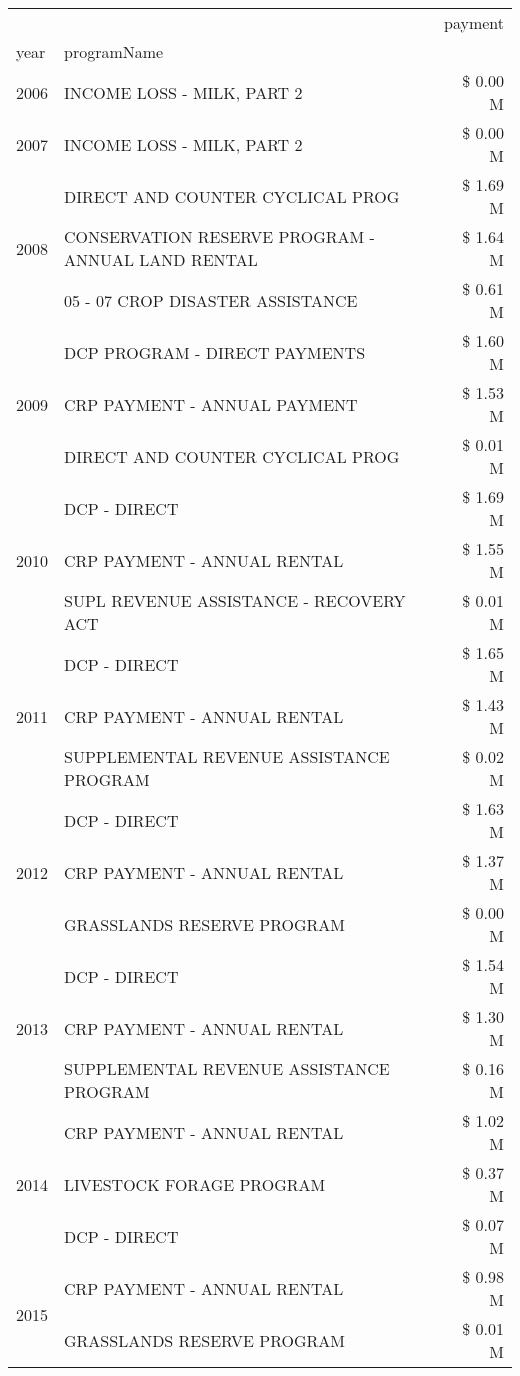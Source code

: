 \begin{tabular}{llr}
\toprule
 &  & payment \\
year & programName &  \\
\midrule
2006 & INCOME LOSS - MILK, PART 2 & \$ 0.00 M \\
\cline{1-3}
2007 & INCOME LOSS - MILK, PART 2 & \$ 0.00 M \\
\cline{1-3}
\multirow[t]{3}{*}{2008} & DIRECT AND COUNTER CYCLICAL PROG & \$ 1.69 M \\
 & CONSERVATION RESERVE PROGRAM - ANNUAL LAND RENTAL & \$ 1.64 M \\
 & 05 - 07 CROP DISASTER ASSISTANCE & \$ 0.61 M \\
\cline{1-3}
\multirow[t]{3}{*}{2009} & DCP PROGRAM - DIRECT PAYMENTS & \$ 1.60 M \\
 & CRP PAYMENT - ANNUAL PAYMENT & \$ 1.53 M \\
 & DIRECT AND COUNTER CYCLICAL PROG & \$ 0.01 M \\
\cline{1-3}
\multirow[t]{3}{*}{2010} & DCP - DIRECT & \$ 1.69 M \\
 & CRP PAYMENT - ANNUAL RENTAL & \$ 1.55 M \\
 & SUPL REVENUE ASSISTANCE - RECOVERY ACT & \$ 0.01 M \\
\cline{1-3}
\multirow[t]{3}{*}{2011} & DCP - DIRECT & \$ 1.65 M \\
 & CRP PAYMENT - ANNUAL RENTAL & \$ 1.43 M \\
 & SUPPLEMENTAL REVENUE ASSISTANCE PROGRAM & \$ 0.02 M \\
\cline{1-3}
\multirow[t]{3}{*}{2012} & DCP - DIRECT & \$ 1.63 M \\
 & CRP PAYMENT - ANNUAL RENTAL & \$ 1.37 M \\
 & GRASSLANDS RESERVE PROGRAM & \$ 0.00 M \\
\cline{1-3}
\multirow[t]{3}{*}{2013} & DCP - DIRECT & \$ 1.54 M \\
 & CRP PAYMENT - ANNUAL RENTAL & \$ 1.30 M \\
 & SUPPLEMENTAL REVENUE ASSISTANCE PROGRAM & \$ 0.16 M \\
\cline{1-3}
\multirow[t]{3}{*}{2014} & CRP PAYMENT - ANNUAL RENTAL & \$ 1.02 M \\
 & LIVESTOCK FORAGE PROGRAM & \$ 0.37 M \\
 & DCP - DIRECT & \$ 0.07 M \\
\cline{1-3}
\multirow[t]{3}{*}{2015} & CRP PAYMENT - ANNUAL RENTAL & \$ 0.98 M \\
 & GRASSLANDS RESERVE PROGRAM & \$ 0.01 M \\

\end{tabular}
